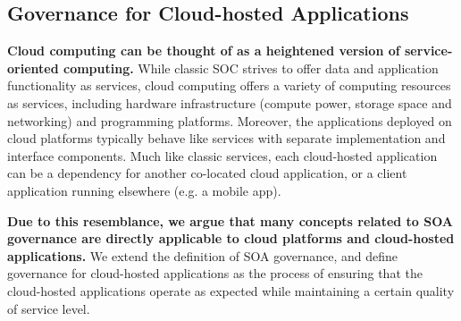 \subsection{Governance for Cloud-hosted Applications}
\textbf{Cloud computing can be thought of as a heightened version of service-oriented computing.} While classic
SOC strives to offer data and application functionality as services, cloud computing offers a variety
of computing resources
as services, including hardware infrastructure (compute power, storage space and networking) and programming
platforms. Moreover, the applications deployed on cloud platforms typically behave like services with
separate implementation and interface components. 
Much like classic services, each cloud-hosted application 
can be a dependency for another
co-located cloud application, or a client application running elsewhere (e.g. a mobile app). 

\textbf{Due to this resemblance, we argue that many concepts related to SOA governance are
directly applicable to cloud platforms and cloud-hosted applications.} 
We extend the definition of SOA governance, and define governance for cloud-hosted applications
as the process of ensuring that the cloud-hosted applications
operate as expected while maintaining a certain quality of service level.

